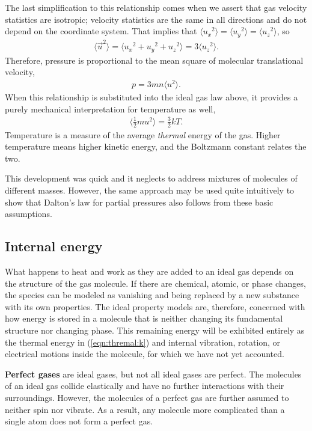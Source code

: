 The last simplification to this relationship comes when we assert that gas velocity statistics are isotropic; velocity statistics are the same in all directions and do not depend on the coordinate system.  That implies that $\langle u_x{^2} \rangle = \langle u_y{^2} \rangle = \langle u_z{^2} \rangle$, so
\begin{align}
\langle \vec{u}^2\rangle = \langle u_x{^2} + u_y{^2} + u_z{^2} \rangle = 3 \langle u_z{^2} \rangle.\label{eqn:ig:3dof}
\end{align}
Therefore, pressure is proportional to the mean square of molecular translational velocity,
\begin{align}
p = 3 m n \langle u{^2} \rangle.
\end{align}
When this relationship is substituted into the ideal gas law above, it provides a purely mechanical interpretation for temperature as well,
\begin{align}
\langle \frac{1}{2} m u{^2} \rangle = \frac{3}{2} k T.\label{eqn:thermal:k}
\end{align}
Temperature is a measure of the average \emph{thermal} energy of the gas.  Higher temperature means higher kinetic energy, and the Boltzmann constant relates the two.

This development was quick and it neglects to address mixtures of molecules of different masses.  However, the same approach may be used quite intuitively to show that Dalton's law for partial pressures also follows from these basic assumptions.

\subsection{Internal energy}

What happens to heat and work as they are added to an ideal gas depends on the structure of the gas molecule.  If there are chemical, atomic, or phase changes, the species can be modeled as vanishing and being replaced by a new substance with its own properties.  The ideal property models are, therefore, concerned with how energy is stored in a molecule that is neither changing its fundamental structure nor changing phase.  This remaining energy will be exhibited entirely as the thermal energy in (\ref{eqn:thremal:k}) and internal vibration, rotation, or electrical motions inside the molecule, for which we have not yet accounted.

{\bf Perfect gases} are ideal gases, but not all ideal gases are perfect.  The molecules of an ideal gas collide elastically and have no further interactions with their surroundings.  However, the molecules of a perfect gas are further assumed to neither spin nor vibrate.  As a result, any molecule more complicated than a single atom does not form a perfect gas.

